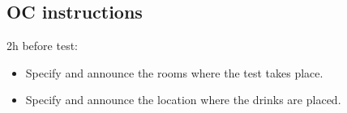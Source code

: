 \subsection{OC instructions}

2h before test:
\begin{itemize}
	\item Specify and announce the rooms where the test takes place.
	\item Specify and announce the location where the drinks are placed.
\end{itemize}

% 